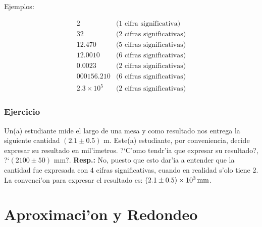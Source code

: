 \documentclass[a4paper]{report}
\begin{document}
Ejemplos:

\begin{equation}
\begin{array}{ll}
2 & (1 \text{ cifra significativa)}\\
32 & (2 \text{ cifras significativas)}\\
12.470 & (5 \text{ cifras significativas)}\\
12.0010 &(6 \text{ cifras significativas)}\\
0.0023 & (2 \text{ cifras significativas)}\\
000156.210 & (6 \text{ cifras significativas)}\\
2.3\times 10^5 &(2 \text{ cifras significativas)}
\end{array}
\end{equation}


\subsubsection{Ejercicio}

Un(a) estudiante mide el largo de una mesa y como resultado nos entrega
la siguiente cantidad $(2.1\pm 0.5)$ m. Este(a) estudiante, por
conveniencia, decide expresar su resultado en mil'imetros. ?`C'omo tendr'ia
que expresar su resultado?, ?`$(2100\pm 50)$ mm?. \textbf{Resp.:} No, puesto que esto dar'ia a entender que la cantidad fue expresada con 4 cifras significativas, cuando en realidad s'olo tiene 2. La convenci'on para expresar el resultado es: $(2.1\pm 0.5)\times 10^3\,\rm mm$.

%

\section{Aproximaci'on y Redondeo}
\end{document}
